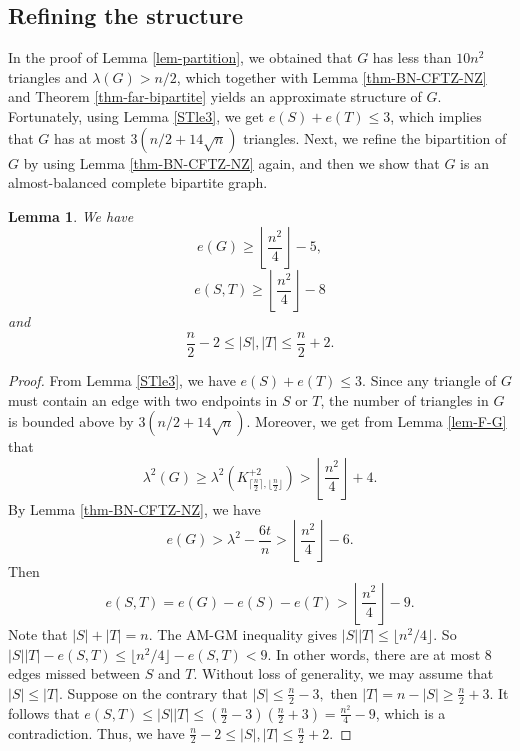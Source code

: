 \documentclass[11pt]{article}
\newtheorem{lemma}[theorem]{Lemma}
\begin{document}
\subsection{Refining the structure} 

\label{sec-5-3}

In the proof of Lemma \ref{lem-partition}, 
we obtained that $G$ has 
less than $10n^2$ triangles and $\lambda (G) > {n}/{2}$,  which together with 
Lemma \ref{thm-BN-CFTZ-NZ} and Theorem \ref{thm-far-bipartite} yields an approximate 
structure of  $G$. 
Fortunately, using Lemma \ref{STle3}, 
we get $e(S)+e(T)\le 3$, which implies that 
$G$ has at most 
$3({n}/{2} + 14\sqrt{n})$ triangles. 
Next, we refine the bipartition of 
$G$ by using Lemma \ref{thm-BN-CFTZ-NZ} again, 
and then we show that 
$G$ is an almost-balanced complete bipartite graph. 



\begin{lemma}\label{STlambdarefine}
We have
\begin{equation*}
e(G)\ge \left\lfloor \frac{n^2}{4} \right\rfloor - 5,
\end{equation*}
\[ e(S,T) \ge \left\lfloor \frac{n^2}{4} \right\rfloor - 8  \]
and 
\begin{equation*}
\frac{n}{2}-2
\le |S|,  |T|\le \frac{n}{2}+2. 
\end{equation*}
\end{lemma}


\begin{proof}
 From Lemma \ref{STle3}, 
  we have $e(S) + e(T) \leq 3$.
  Since any triangle of $G$ must contain an 
  edge with two endpoints in $S$ or $T$, 
  the number of triangles in $G$ is bounded above by 
  $3({n}/{2} +14 \sqrt{n})$. 
  Moreover, we get from Lemma \ref{lem-F-G} that 
  \[ \lambda^2(G) \ge \lambda^2 (K_{\lceil \frac{n}{2} \rceil, \lfloor \frac{n}{2} \rfloor}^{+2}) > 
  \left\lfloor \frac{n^2}{4} \right\rfloor  +4. \]
       By Lemma \ref{thm-BN-CFTZ-NZ}, 
       we have $$e(G) > \lambda^2-\frac{6t}{n} 
       > \left\lfloor \frac{n^2}{4} \right\rfloor  - 6.$$
Then 
\[ e(S,T) = e(G) - e(S) - e(T)
 > \left\lfloor\frac{n^2}{4} \right\rfloor -9. \]
Note that $|S| + |T|=n$. The AM-GM inequality gives 
$ |S| |T| \le \lfloor n^2/4 \rfloor $. 
So $|S||T| - e(S,T) \le 
\lfloor n^2/4  \rfloor - e(S,T) <9$. 
In other words, there are at most $8$ edges missed between $S$ and $T$. 
Without loss of generality, 
we may assume that $|S| \le |T|$. 
       Suppose on the contrary  
       that $|S|\le \frac{n}{2}-3,$ then $|T|=n-|S|\ge \frac{n}{2}+3$. It follows that 
       $e(S,T)\le  |S||T|\le  \left (\frac{n}{2}-3 \right) \left(\frac{n}{2}+3 \right)= \frac{n^2}{4}-9$, 
        which is a contradiction. 
        Thus, we have
        $ \frac{n}{2}-2
\le |S|,  |T|\le \frac{n}{2}+2. $
\end{proof}
\end{document}
